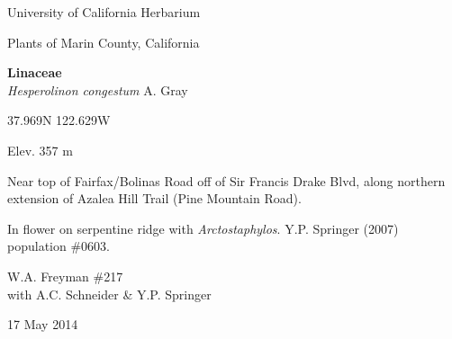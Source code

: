 \documentclass[letterpaper,10pt]{article}
\begin{document}
\begin{minipage}[t]{0.40\textwidth}

\begin{center}
University of California Herbarium \\
\begin{large}
Plants of Marin County, California \\
\end{large}
\vspace{\baselineskip}
\textbf{Linaceae} \\
\textit{Hesperolinon congestum} A. Gray\\
\end{center}

\begin{footnotesize}

\begin{multicols}{2}
37.969\textdegree N 122.629\textdegree W
\columnbreak
\begin{flushright}
Elev. 357 m
\end{flushright}
\end{multicols}

Near top of Fairfax/Bolinas Road off of Sir Francis Drake Blvd, along northern extension of Azalea Hill Trail (Pine Mountain Road).
\vspace{\baselineskip}

In flower on serpentine ridge with \textit{Arctostaphylos}. Y.P. Springer (2007) population \#0603.

\begin{multicols}{2}
W.A. Freyman \#217 \\
with A.C. Schneider \& Y.P. Springer
\columnbreak
\begin{flushright}
17 May 2014
\end{flushright}
\end{multicols}

\end{footnotesize}

\end{minipage}

\vspace{2cm}
%
%

%
%
\end{document}

